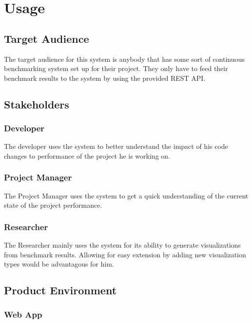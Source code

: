 \section{Usage}

\subsection{Target Audience}

The target audience for this system is anybody that has some sort of continuous benchmarking system set up for their project. They only have to feed their benchmark results to the system by using the provided \gls{REST API}.

\subsection{Stakeholders}

\subsubsection*{Developer}

The developer uses the system to better understand the impact of his code changes to performance of the project he is working on.

\subsubsection*{Project Manager}

The Project Manager uses the system to get a quick understanding of the current state of the project performance.

\subsubsection*{Researcher}

The Researcher mainly uses the system for its ability to generate \glspl{visualization} from benchmark results. Allowing for easy extension by adding new \gls{visualization} types would be advantagous for him.


\subsection{Product Environment}

\subsubsection{Web App}

